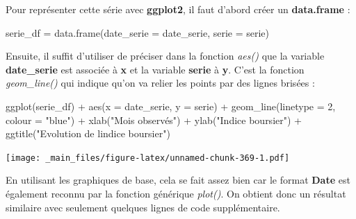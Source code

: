 \documentclass[
]{book}
\newenvironment{Shaded}{\begin{snugshade}}{\end{snugshade}}
\newcommand{\AttributeTok}[1]{\textcolor[rgb]{0.77,0.63,0.00}{#1}}
\newcommand{\DecValTok}[1]{\textcolor[rgb]{0.00,0.00,0.81}{#1}}
\newcommand{\FunctionTok}[1]{\textcolor[rgb]{0.00,0.00,0.00}{#1}}
\newcommand{\NormalTok}[1]{#1}
\newcommand{\OtherTok}[1]{\textcolor[rgb]{0.56,0.35,0.01}{#1}}
\newcommand{\SpecialCharTok}[1]{\textcolor[rgb]{0.00,0.00,0.00}{#1}}
\newcommand{\StringTok}[1]{\textcolor[rgb]{0.31,0.60,0.02}{#1}}
\theoremstyle{definition}
\theoremstyle{definition}
\theoremstyle{definition}
\theoremstyle{definition}
\theoremstyle{remark}
\begin{document}
Pour représenter cette série avec \textbf{ggplot2}, il faut d'abord créer un \textbf{data.frame} :

\begin{Shaded}
\begin{Highlighting}[]
\NormalTok{serie\_df }\OtherTok{=} \FunctionTok{data.frame}\NormalTok{(}\AttributeTok{date\_serie =}\NormalTok{ date\_serie, }\AttributeTok{serie =}\NormalTok{ serie)}
\end{Highlighting}
\end{Shaded}

Ensuite, il suffit d'utiliser de préciser dans la fonction \emph{aes()} que la variable \textbf{date\_serie} est associée à \textbf{x} et la variable \textbf{serie} à \textbf{y}. C'est la fonction \emph{geom\_line()} qui indique qu'on va relier les points par des lignes brisées :

\begin{Shaded}
\begin{Highlighting}[]
\FunctionTok{ggplot}\NormalTok{(serie\_df) }\SpecialCharTok{+}             
  \FunctionTok{aes}\NormalTok{(}\AttributeTok{x =}\NormalTok{ date\_serie, }\AttributeTok{y =}\NormalTok{ serie) }\SpecialCharTok{+} 
  \FunctionTok{geom\_line}\NormalTok{(}\AttributeTok{linetype =} \DecValTok{2}\NormalTok{, }\AttributeTok{colour =} \StringTok{"blue"}\NormalTok{)  }\SpecialCharTok{+} 
  \FunctionTok{xlab}\NormalTok{(}\StringTok{"Mois observés"}\NormalTok{) }\SpecialCharTok{+}
  \FunctionTok{ylab}\NormalTok{(}\StringTok{"Indice boursier"}\NormalTok{) }\SpecialCharTok{+}
  \FunctionTok{ggtitle}\NormalTok{(}\StringTok{"Evolution de l\textquotesingle{}indice boursier"}\NormalTok{)}
\end{Highlighting}
\end{Shaded}

\texttt{[image: \_main\_files/figure-latex/unnamed-chunk-369-1.pdf]}

En utilisant les graphiques de base, cela se fait assez bien car le format \textbf{Date} est également reconnu par la fonction générique \emph{plot()}. On obtient donc un résultat similaire avec seulement quelques lignes de code supplémentaire.
\end{document}
